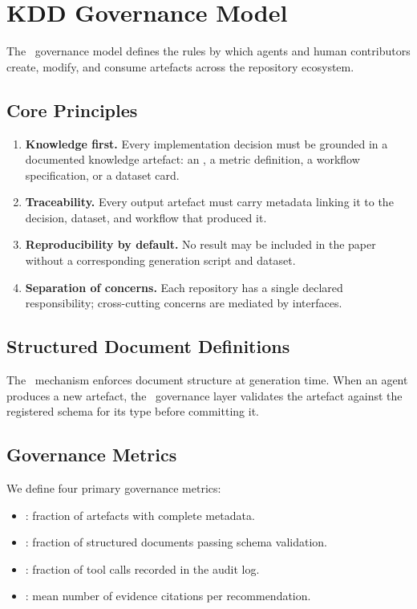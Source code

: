 \section{KDD Governance Model}
\label{sec:kdd-governance}

The \kdd~governance model defines the rules by which agents and human contributors
create, modify, and consume artefacts across the repository ecosystem.

\subsection{Core Principles}

\begin{enumerate}
  \item \textbf{Knowledge first.} Every implementation decision must be grounded
    in a documented knowledge artefact: an \adr, a metric definition, a workflow
    specification, or a dataset card.
  \item \textbf{Traceability.} Every output artefact must carry metadata linking
    it to the decision, dataset, and workflow that produced it.
  \item \textbf{Reproducibility by default.} No result may be included in the
    paper without a corresponding generation script and dataset.
  \item \textbf{Separation of concerns.} Each repository has a single declared
    responsibility; cross-cutting concerns are mediated by interfaces.
\end{enumerate}

\subsection{Structured Document Definitions}

The \sdd~mechanism enforces document structure at generation time. When an agent
produces a new artefact, the \kdd~governance layer validates the artefact against
the registered schema for its type before committing it.

\subsection{Governance Metrics}

We define four primary governance metrics:

\begin{itemize}
  \item {}: fraction of artefacts with complete metadata.
  \item {}: fraction of structured documents passing
    schema validation.
  \item {}: fraction of tool calls recorded in the audit log.
  \item {}: mean number of evidence citations per
    recommendation.
\end{itemize}
